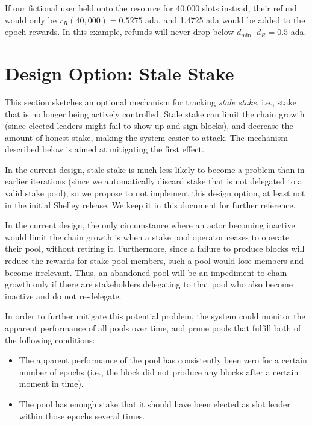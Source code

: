 \documentclass[11pt,a4paper]{article}
\begin{document}
If our fictional user held onto the resource for 40,000 slots instead,
their refund would only be $r_R(40,000)=0.5275$ ada, and 1.4725 ada
would be added to the epoch rewards. In this example, refunds will
never drop below $d_{\min}\cdot d_R=0.5$ ada.

\section{Design Option: Stale Stake}
\label{stale-stake}

This section sketches an optional mechanism for tracking \emph{stale
  stake}, i.e., stake that is no longer being actively
controlled. Stale stake can limit the chain growth (since elected
leaders might fail to show up and sign blocks), and decrease the
amount of honest stake, making the system easier to attack. The
mechanism described below is aimed at mitigating the first effect.

In the current design, stale stake is much less likely to become a
problem than in earlier iterations (since we automatically discard
stake that is not delegated to a valid stake pool), so we propose to
not implement this design option, at least not in the initial Shelley
release. We keep it in this document for further reference.

In the current design, the only circumstance where an actor becoming inactive
would limit the chain growth is when a stake pool operator ceases to operate
their pool, without retiring it. Furthermore, since a failure to produce blocks
will reduce the rewards for stake pool members, such a pool would lose members
and become irrelevant. Thus, an abandoned pool will be an impediment to chain
growth only if there are stakeholders delegating to that pool who also become
inactive and do not re-delegate.

In order to further mitigate this potential problem, the system could monitor
the apparent performance of all pools over time, and prune pools that fulfill
both of the following conditions:

\begin{itemize}
  \item The apparent performance of the pool has consistently been zero for a
    certain number of epochs (i.e., the block did not produce any blocks after a
    certain moment in time).
  \item The pool has enough stake that it should have been elected as slot
    leader within those epochs several times.
\end{itemize}
\end{document}
